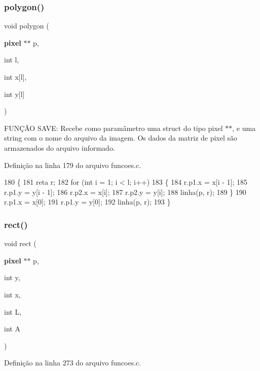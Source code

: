 \subsubsection{polygon()}
{\footnotesize\ttfamily void polygon (\begin{DoxyParamCaption}\item[{\textbf{ pixel} $\ast$$\ast$}]{p,  }\item[{int}]{l,  }\item[{int}]{x[l],  }\item[{int}]{y[l] }\end{DoxyParamCaption})}



F\+U\+NÇÃO S\+A\+VE\+: Recebe como paramâmetro uma struct do tipo pixel $\ast$$\ast$, e uma string com o nome do arquivo da imagem. Os dados da matriz de pixel são armazenados do arquivo informado. 



Definição na linha 179 do arquivo funcoes.\+c.


\begin{DoxyCode}
180 \{
181     reta r;
182     \textcolor{keywordflow}{for} (\textcolor{keywordtype}{int} i = 1; i < l; i++)
183     \{
184         r.p1.x = x[i - 1];
185         r.p1.y = y[i - 1];
186         r.p2.x = x[i];
187         r.p2.y = y[i];
188         linha(p, r);
189     \}
190     r.p1.x = x[0];
191     r.p1.y = y[0];
192     linha(p, r);
193 \}
\end{DoxyCode}
\mbox{\label{funcoes_8c_a04aebb952a0ddbc8a6e5a279d9d3ce53}} 
\subsubsection{rect()}
{\footnotesize\ttfamily void rect (\begin{DoxyParamCaption}\item[{\textbf{ pixel} $\ast$$\ast$}]{p,  }\item[{int}]{y,  }\item[{int}]{x,  }\item[{int}]{L,  }\item[{int}]{A }\end{DoxyParamCaption})}



Definição na linha 273 do arquivo funcoes.\+c.


